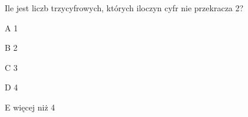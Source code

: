 \begin{tresc}
Ile jest liczb trzycyfrowych, których iloczyn cyfr nie przekracza 2?
\end{tresc}
\begin{wariant}{A} 1 \end{wariant}
\begin{wariant}{B} 2 \end{wariant}
\begin{wariant}{C} 3 \end{wariant}
\begin{wariant}{D} 4 \end{wariant}
\begin{wariant}{E} więcej niż 4 \end{wariant}
